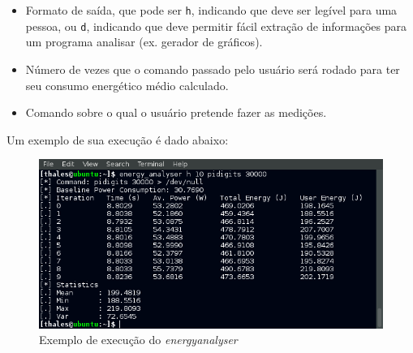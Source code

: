 \begin{itemize}
\item Formato de saída, que pode ser {\tt h}, indicando que deve ser legível para uma pessoa, ou {\tt d}, indicando que deve permitir fácil extração de informações para um programa analisar (ex. gerador de gráficos). 

\item Número de vezes que o comando passado pelo usuário será rodado para ter seu consumo energético médio calculado.

\item Comando sobre o qual o usuário pretende fazer as medições.

\end{itemize}
Um exemplo de sua execução é dado abaixo:
\begin{figure}[htp]
\centering
\includegraphics[scale=0.50]{figuras/MetMed/energy_analyser_pidigits.png}
\caption{Exemplo de execução do \emph{energyanalyser}}
\label{energyanalyser_pidigits}
\end{figure}
\FloatBarrier

